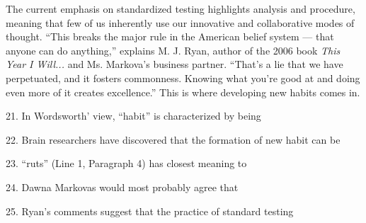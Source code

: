 \qquad The current emphasis on standardized testing highlights analysis and procedure, meaning that few of us inherently use our innovative and collaborative modes of thought. ``This breaks the major rule in the American belief system — that anyone can do anything,'' explains M. J. Ryan, author of the 2006 book \emph{This Year I Will...} and Ms. Markova's business partner. ``That's a lie that we have perpetuated, and it fosters commonness. Knowing what you're good at and doing even more of it creates excellence.'' This is where developing new habits comes in.

\vspace{6pt}

21. In Wordsworth' view, ``habit'' is characterized by being\par

22. Brain researchers have discovered that the formation of new habit can be\par

23. ``ruts'' (Line 1, Paragraph 4) has closest meaning to\par

24. Dawna Markovas would most probably agree that\par

25. Ryan's comments suggest that the practice of standard testing\par
